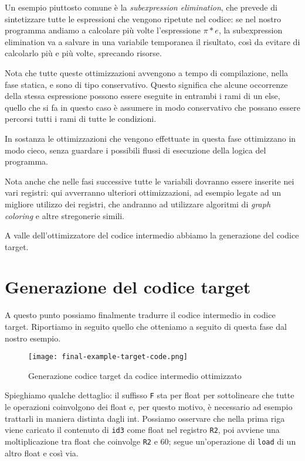 \documentclass[class=book, crop=false, oneside, 12pt]{standalone}
\begin{document}
Un esempio piuttosto comune è la \emph{subexpression elimination}, che prevede di sintetizzare tutte le espressioni che vengono ripetute nel codice: se nel nostro programma andiamo a calcolare più volte l'espressione \(\pi * e\), la subexpression elimination va a salvare in una variabile temporanea il risultato, così da evitare di calcolarlo più e più volte, sprecando risorse.

Nota che tutte queste ottimizzazioni avvengono a tempo di compilazione, nella fase statica, e sono di tipo conservativo. Questo significa che alcune occorrenze della stessa espressione possono essere eseguite in entrambi i rami di un else, quello che si fa in questo caso è assumere in modo conservativo che possano essere percorsi tutti i rami di tutte le condizioni.

In sostanza le ottimizzazioni che vengono effettuate in questa fase ottimizzano in modo cieco, senza guardare i possibili flussi di esecuzione della logica del programma.

Nota anche che nelle fasi successive tutte le variabili dovranno essere inserite nei vari registri: qui avverranno ulteriori ottimizzazioni, ad esempio legate ad un migliore utilizzo dei registri, che andranno ad utilizzare algoritmi di \emph{graph coloring} e altre stregonerie simili.

A valle dell'ottimizzatore del codice intermedio abbiamo la generazione del codice target.

\section{Generazione del codice target}
A questo punto possiamo finalmente tradurre il codice intermedio in codice target. Riportiamo in seguito quello che otteniamo a seguito di questa fase dal nostro esempio.
\begin{figure}[H]
    \centering
    \texttt{[image: final-example-target-code.png]}
    \caption{Generazione codice target da codice intermedio ottimizzato}
    \label{fig:final-example-target-code}
\end{figure}
Spieghiamo qualche dettaglio: il suffisso \texttt{F} sta per float per sottolineare che tutte le operazioni coinvolgono dei float e, per questo motivo, è necessario ad esempio trattarli in maniera distinta dagli int. Possiamo osservare che nella prima riga viene caricato il contenuto di \texttt{id3} come float nel registro \texttt{R2}, poi avviene una moltiplicazione tra float che coinvolge \texttt{R2} e \(60\); segue un'operazione di \texttt{load} di un altro float e così via.
\end{document}
